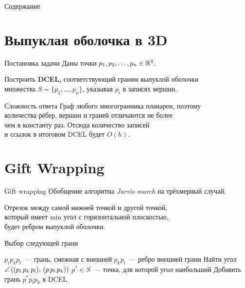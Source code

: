 \documentclass[12pt,aspectratio=169,svgnames]{beamer}
\begin{document}
 \maketitle

\begin{frame}{Содержание}
	\tableofcontents
\end{frame}

\section{Выпуклая оболочка в 3D}

\begin{frame}{Постановка задачи}
	Даны точки \(p_1, p_2, \ldots, p_n \in \mathbb{R}^3\).

	Построить {\bf DCEL,} соответствующий граням выпуклой оболочки \\
	множества \(S = \{p_1, \ldots, p_n\}\), указывая \(p_i\) в записях вершин.
\end{frame}


\begin{frame}{Сложность ответа}
	Граф любого многогранника планарен, поэтому \\
	количества рёбер, вершин и граней отличаются не более \\
	чем в константу раз. Отсюда количество записей \\
	и ссылок в итоговом DCEL будет \(O(h)\).
\end{frame}


\section{Gift Wrapping}

\begin{frame}{Gift wrapping}
	Обобщение алгоритма {\it Jarvis march} на трёхмерный случай.

	Отрезок между самой нижней точкой и другой точкой, \\
	который имеет min угол с горизонтальной плоскостью, \\
	будет ребром выпуклой оболочки.
\end{frame}


\begin{frame}{Выбор следующей грани}
\begin{center} \begin{algorithmic}
      \State \(p_i p_k p_l\)~— грань, смежная с внешней
      \State \(p_k p_l\)~— ребро внешней грани
         \State Найти угол \(\angle\,\lr*{\lr*{p_i\,p_k\,p_l},\,\lr*{p\,p_l\,p_k}}\)
      \EndFor
      \State \(p^* \in S\)~— точка, для которой угол наибольший
      \State Добавить грань \(p^*p_lp_k\) в DCEL
   \EndWhile \pause {}
\end{algorithmic} \end{center}
\end{frame}
\end{document}
